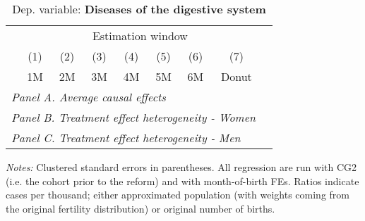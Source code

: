  \begin{table}[H] \begin{threeparttable} \centering \caption{Dep. variable: \textbf{Diseases of the digestive system}} {\def\sym#1{\ifmmode^{#1}\else\(^{#1}\)\fi} \begin{tabular}{l*{8}{c}} \toprule & \multicolumn{7}{c}{Estimation window} \\ \cmidrule(lr){2-8}
            &\multicolumn{1}{c}{(1)}&\multicolumn{1}{c}{(2)}&\multicolumn{1}{c}{(3)}&\multicolumn{1}{c}{(4)}&\multicolumn{1}{c}{(5)}&\multicolumn{1}{c}{(6)}&\multicolumn{1}{c}{(7)}\\
            &\multicolumn{1}{c}{1M}&\multicolumn{1}{c}{2M}&\multicolumn{1}{c}{3M}&\multicolumn{1}{c}{4M}&\multicolumn{1}{c}{5M}&\multicolumn{1}{c}{6M}&\multicolumn{1}{c}{Donut}\\
\midrule
 \multicolumn{8}{l}{\emph{Panel A. Average causal effects}} \\       \midrule\multicolumn{8}{l}{\emph{Panel B. Treatment effect heterogeneity - Women}} \\       \midrule\multicolumn{8}{l}{\emph{Panel C. Treatment effect heterogeneity - Men}} \\       
\bottomrule \end{tabular} } \begin{tablenotes} \item \scriptsize \emph{Notes:} Clustered standard errors in parentheses. All regression are run with CG2 (i.e. the cohort prior to the reform) and with month-of-birth FEs. Ratios indicate cases per thousand; either approximated population (with weights coming from the original fertility distribution) or original number of births. \end{tablenotes} \end{threeparttable} \end{table} 

